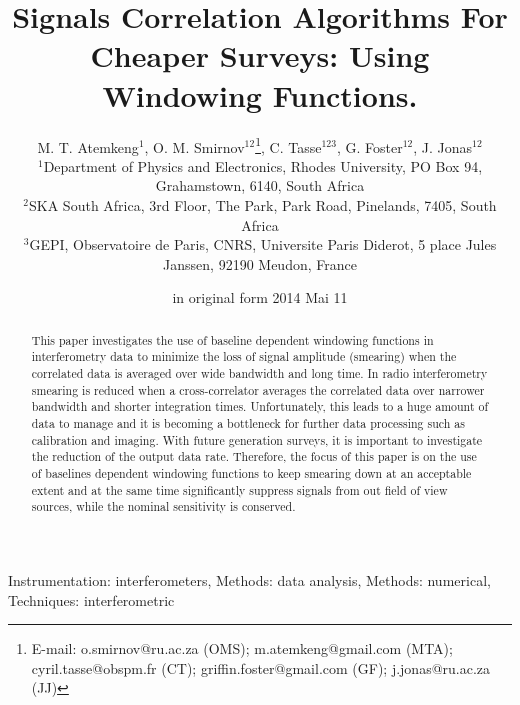\documentclass[useAMS,usenatbib]{mn2e}
\title[Correlator Windowing Functions For Cheaper Surveys]{Signals Correlation Algorithms For Cheaper Surveys: Using Windowing Functions. 
}
\author[M. T. Atemkeng , O. M. Smirnov, C. Tasse, G. Foster and J. Jonas]{M. T. Atemkeng$^{1}$, O. M. Smirnov$^{12}$\thanks{E-mail: 
o.smirnov@ru.ac.za (OMS); m.atemkeng@gmail.com (MTA); cyril.tasse@obspm.fr (CT); griffin.foster@gmail.com (GF); j.jonas@ru.ac.za (JJ)}, 
 C. Tasse$^{123}$, G. Foster$^{12}$, J. Jonas$^{12}$ \\
$^1$Department of Physics and Electronics, Rhodes University, PO Box 94, Grahamstown, 6140, South Africa\\
$^2$SKA South Africa, 3rd Floor, The Park, Park Road, Pinelands, 7405, South Africa\\
$^3$GEPI, Observatoire de Paris, CNRS, Universite Paris Diderot, 5 place Jules Janssen, 92190 Meudon, France}
\begin{document}
\date{in original form 2014 Mai 11}

\pagerange{\pageref{firstpage}--\pageref{lastpage}} 

\maketitle

\label{firstpage}

\begin{abstract}
This paper investigates the use of baseline dependent windowing functions in interferometry data to minimize the loss of 
signal amplitude (smearing) when the correlated data is averaged over wide bandwidth and long time. In radio interferometry smearing is 
reduced when a cross-correlator averages the correlated data over narrower bandwidth and shorter integration times. Unfortunately, this 
leads to a huge amount of data to manage and it is becoming a bottleneck for further data processing such as calibration and 
imaging.  With future generation surveys, it is important to investigate the reduction of the output data rate. Therefore, the focus of 
this paper is on the use of baselines dependent windowing functions to keep smearing down at an acceptable extent and at the same time 
significantly suppress signals 
from out field of view sources, while the nominal sensitivity is conserved. 
\end{abstract}
\begin{keywords}
Instrumentation: interferometers, Methods: data analysis, Methods: numerical, Techniques: interferometric
\end{keywords}
\end{document}
